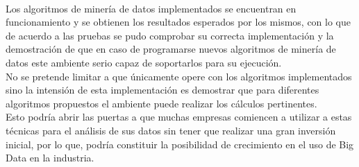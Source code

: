 \\
Los algoritmos de minería de datos implementados se encuentran en funcionamiento y se obtienen los resultados esperados por los mismos, con lo que de acuerdo a las pruebas se pudo comprobar su correcta implementación y la demostración de que en caso de programarse nuevos algoritmos de minería de datos este ambiente serio capaz de soportarlos para su ejecución.
\\
No se pretende limitar a que únicamente opere con los algoritmos implementados sino la intensión de esta implementación es demostrar que para diferentes algoritmos propuestos el ambiente puede realizar los cálculos pertinentes.
\\ 
Esto podría abrir las puertas a que muchas empresas comiencen a utilizar a estas técnicas para el análisis de sus datos sin tener que realizar una gran inversión inicial, por lo que, podría constituir la posibilidad de crecimiento en el uso de Big Data en la industria.
